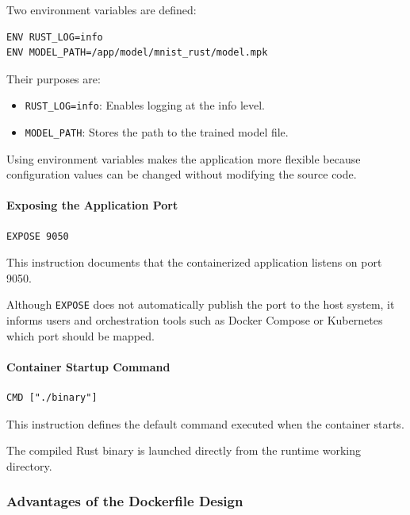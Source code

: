 \documentclass{ieeeaccess}
\begin{document}
Two environment variables are defined:

\begin{lstlisting}
ENV RUST_LOG=info
ENV MODEL_PATH=/app/model/mnist_rust/model.mpk
\end{lstlisting}

Their purposes are:

\begin{itemize}
    \item \texttt{RUST\_LOG=info}: Enables logging at the info level.
    \item \texttt{MODEL\_PATH}: Stores the path to the trained model file.
\end{itemize}

Using environment variables makes the application more flexible because configuration values can be changed without modifying the source code.

\paragraph{Exposing the Application Port}

\begin{lstlisting}
EXPOSE 9050
\end{lstlisting}

This instruction documents that the containerized application listens on port 9050.

Although \texttt{EXPOSE} does not automatically publish the port to the host system, it informs users and orchestration tools such as Docker Compose or Kubernetes which port should be mapped.

\paragraph{Container Startup Command}

\begin{lstlisting}
CMD ["./binary"]
\end{lstlisting}

This instruction defines the default command executed when the container starts.

The compiled Rust binary is launched directly from the runtime working directory.

\subsubsection{Advantages of the Dockerfile Design}
\end{document}
